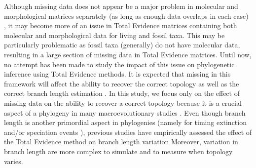 \documentclass[12pt,letterpaper]{article}
\begin{document}
Although missing data does not appear be a major problem in molecular and morphological matrices separately (as long as enough data overlaps in each case) \citep{wiensmissing2003,wiensmissing2006,wiensmissing2008,rouresite-specific2011,pattinsonphylogeny2014}, it may become more of an issue in Total Evidence matrices containing both molecular and morphological data for living and fossil taxa. This may be particularly problematic as fossil taxa (generally) do not have molecular data, resulting in a large section of missing data in Total Evidence matrices. Until now, no attempt has been made to study the impact of this issue on phylogenetic inference using Total Evidence methods.
It is expected that missing in this framework will affect the ability to recover the correct topology as well as the correct branch length estimation \citep{wiensmissing2003,wiensmissing2006,wiensmissing2008,lemmonthe2009,rouresite-specific2011,sansomfossilization2013,pattinsonphylogeny2014,sansombias2014}. In this study, we focus only on the effect of missing data on the ability to recover a correct topology because it is a crucial aspect of a phylogeny in many macroevolutionary studies \citep[e.g.][]{manosphylogeny2007,meredithimpacts2011,jetzthe2012}. %
Even though branch length is another primordial aspect in phylogenies (namely for timing extinction and/or speciation events \citep[e.g.][]{ronquista2012}), previous studies have empirically assessed the effect of the Total Evidence method on branch length variation \citep{ronquista2012,schragocombining2013,slaterphylogenetic2013,beckancient2014} %
Moreover, variation in branch length are more complex to simulate and to measure when topology varies.

\end{document}
